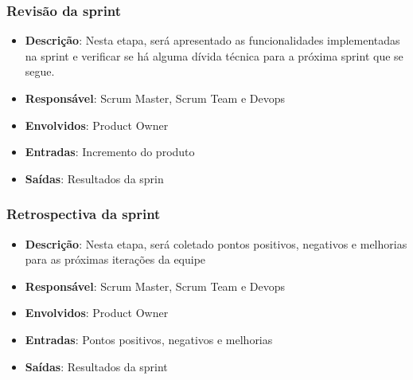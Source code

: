 \subsubsection{Revisão da sprint}

\begin{itemize}
  \item \textbf{Descrição}: Nesta etapa, será apresentado as funcionalidades implementadas na sprint e verificar se há alguma dívida técnica para a próxima sprint que se segue.
  \item \textbf{Responsável}: Scrum Master, Scrum Team e Devops
  \item \textbf{Envolvidos}: Product Owner
  \item \textbf{Entradas}: Incremento do produto
  \item \textbf{Saídas}: Resultados da sprin
\end{itemize}

\subsubsection{Retrospectiva da sprint}

\begin{itemize}
  \item \textbf{Descrição}: Nesta etapa, será coletado pontos positivos, negativos e melhorias para as próximas iterações da equipe
  \item \textbf{Responsável}: Scrum Master, Scrum Team e Devops
  \item \textbf{Envolvidos}: Product Owner
  \item \textbf{Entradas}: Pontos positivos, negativos e melhorias
  \item \textbf{Saídas}: Resultados da sprint
\end{itemize}
